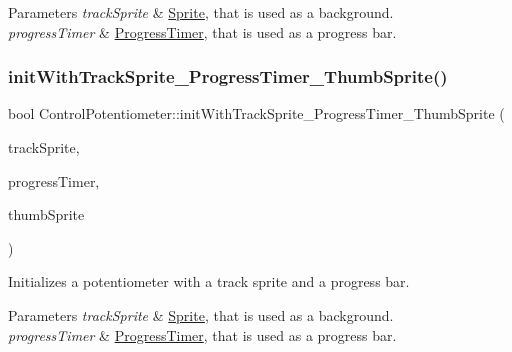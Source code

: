 \begin{DoxyParams}{Parameters}
{\em track\+Sprite} & \hyperlink{classSprite}{Sprite}, that is used as a background. \\
\hline
{\em progress\+Timer} & \hyperlink{classProgressTimer}{Progress\+Timer}, that is used as a progress bar. \\
\hline
\end{DoxyParams}
\mbox{\label{classControlPotentiometer_afac9c374d17a3eb0b1135ae0e0b55678}} 
\subsubsection{\texorpdfstring{init\+With\+Track\+Sprite\+\_\+\+Progress\+Timer\+\_\+\+Thumb\+Sprite()}{initWithTrackSprite\_ProgressTimer\_ThumbSprite()}\hspace{0.1cm}{\footnotesize\ttfamily [2/2]}}
{\footnotesize\ttfamily bool Control\+Potentiometer\+::init\+With\+Track\+Sprite\+\_\+\+Progress\+Timer\+\_\+\+Thumb\+Sprite (\begin{DoxyParamCaption}\item[{\hyperlink{classSprite}{Sprite} $\ast$}]{track\+Sprite,  }\item[{\hyperlink{classProgressTimer}{Progress\+Timer} $\ast$}]{progress\+Timer,  }\item[{\hyperlink{classSprite}{Sprite} $\ast$}]{thumb\+Sprite }\end{DoxyParamCaption})}

Initializes a potentiometer with a track sprite and a progress bar.


\begin{DoxyParams}{Parameters}
{\em track\+Sprite} & \hyperlink{classSprite}{Sprite}, that is used as a background. \\
\hline
{\em progress\+Timer} & \hyperlink{classProgressTimer}{Progress\+Timer}, that is used as a progress bar. \\
\hline
\end{DoxyParams}
\mbox{\label{classControlPotentiometer_a484e056833311821d4ea2f3ec4bde790}} 
